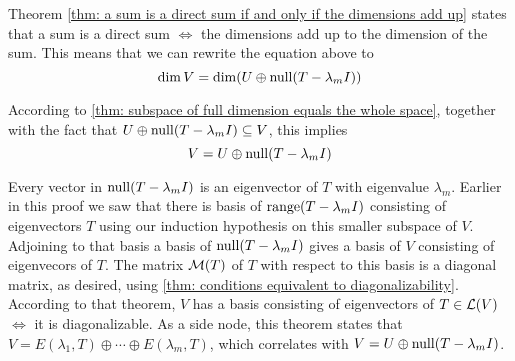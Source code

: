 \begin{prf}
  Theorem \ref{thm: a sum is a direct sum if and only if the dimensions add up} states that a sum is a direct sum $\iff$ the dimensions add up to the dimension of the sum. This means that we can rewrite the equation above to
  \begin{equation}
    \dim V = \dim (U \oplus \operatorname{null} (T-\lambda_m I))
  \end{equation}

  According to \ref{thm: subspace of full dimension equals the whole space}, together with the fact that $U \oplus \operatorname{null} (T-\lambda_m I) \subseteq V$, this implies
  \begin{equation}
    V=U \oplus \operatorname{null} (T-\lambda_m I)
  \end{equation}

  Every vector in $\operatorname{null} (T-\lambda_m I)$ is an eigenvector of $T$ with eigenvalue $\lambda_m$. Earlier in this proof we saw that there is basis of $\operatorname{range}(T-\lambda_mI)$ consisting of eigenvectors $T$ using our induction hypothesis on this smaller subspace of $V$. Adjoining to that basis a basis of $\operatorname{null}(T-\lambda_mI)$ gives a basis of $V$ consisting of eigenvecors of $T$. The matrix $\mathcal{M}(T)$ of $T$ with respect to this basis is a diagonal matrix, as desired, using \ref{thm: conditions equivalent to diagonalizability}. According to that theorem, $V$ has a basis consisting of eigenvectors of $T \in \mathcal{L}(V)$ $\iff$ it is diagonalizable. As a side node, this theorem states that $V = E(\lambda_1, T) \oplus \cdots \oplus E(\lambda_m, T)$, which correlates with $V=U\oplus \operatorname{null} (T-\lambda_m I)$.
\end{prf}

